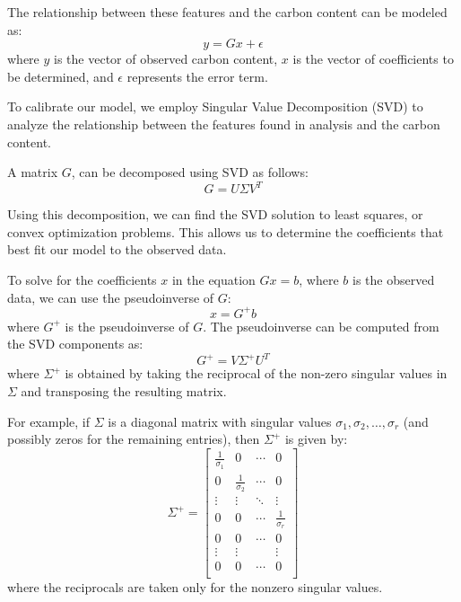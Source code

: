 \documentclass[preprint, 12pt, authoryear]{elsarticle}
\begin{document}
The relationship between these features and the carbon content can be modeled as:
\[
y = Gx + \epsilon
\]
where $y$ is the vector of observed carbon content, $x$ is the vector of coefficients to be determined, and $\epsilon$ represents the error term.

To calibrate our model, we employ Singular Value Decomposition (SVD) to 
analyze the relationship between the features found in analysis and the carbon content.

A matrix $G$, can be decomposed using SVD as follows:
\begin{equation}
    G = U \Sigma V^T
\end{equation}

Using this decomposition, we can find the SVD solution to least squares, or convex optimization problems.
This allows us to determine the coefficients that best fit our model to the observed data.

To solve for the coefficients $x$ in the equation $Gx = b$, where $b$ is the observed data, we can use the pseudoinverse of $G$:
\begin{equation}
    x = G^+ b
\end{equation}
where $G^+$ is the pseudoinverse of $G$.
The pseudoinverse can be computed from the SVD components as:
\begin{equation}
    G^+ = V \Sigma^+ U^T
\end{equation}
where $\Sigma^+$ is obtained by taking the reciprocal of the non-zero singular values in $\Sigma$ and transposing the resulting matrix.

For example, if $\Sigma$ is a diagonal matrix with singular values $\sigma_1, \sigma_2, \ldots, \sigma_r$ (and possibly zeros for the remaining entries), then $\Sigma^+$ is given by:
\begin{equation}
    \Sigma^+ = 
    \begin{bmatrix}
        \frac{1}{\sigma_1} & 0 & \cdots & 0 \\
        0 & \frac{1}{\sigma_2} & \cdots & 0 \\
        \vdots & \vdots & \ddots & \vdots \\
        0 & 0 & \cdots & \frac{1}{\sigma_r} \\
        0 & 0 & \cdots & 0 \\
        \vdots & \vdots & & \vdots \\
        0 & 0 & \cdots & 0 \\
    \end{bmatrix}
\end{equation}
where the reciprocals are taken only for the nonzero singular values.
\end{document}
